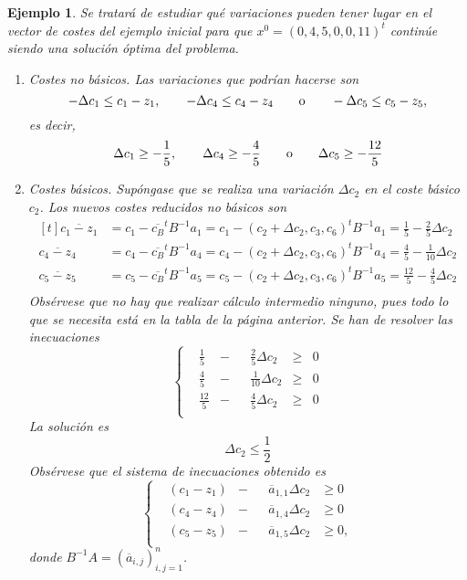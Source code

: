 \documentclass[11pt]{report}
\theoremstyle{mytheorem}
\theoremstyle{mydefinition}
\theoremstyle{myexample}
\newtheorem*{example}{Ejemplo}
\begin{document}
\begin{example}
Se tratará de estudiar qué variaciones pueden tener lugar en el vector de costes del ejemplo inicial para que $x^0 = (0,4,5,0,0,11)^t$ continúe siendo una solución óptima del problema.
\begin{enumerate}
    \item \textit{Costes no básicos}. Las variaciones que podrían hacerse son
    \[-\Delta c_1 \leq c_1-z_1, \qquad -\Delta c_4 \leq c_4-z_4 \qquad \textup{o} \qquad -\Delta c_5 \leq c_5-z_5,\]
    es decir,
    \[\Delta c_1 \geq -\frac{1}{5}, \qquad \Delta c_4 \geq -\frac{4}{5} \qquad \textup{o} \qquad \Delta c_5 \geq -\frac{12}{5}\]
    \item \textit{Costes básicos}. Supóngase que se realiza una variación $\Delta c_2$ en el coste básico $c_2$. Los nuevos costes reducidos no básicos son
    \[\begin{aligned}[t]
        \overline{c_1-z_1} &= c_1-\overline{c_B}^tB^{-1}a_1 = c_1-
            (c_2+\Delta c_2, c_3, c_6)^tB^{-1}a_1 = \frac{1}{5}-\frac{2}{5}\Delta c_2\\[5pt]
        \overline{c_4-z_4} &= c_4-\overline{c_B}^tB^{-1}a_4 = c_4-
            (c_2+\Delta c_2, c_3, c_6)^tB^{-1}a_4 = \frac{4}{5}-\frac{1}{10} \Delta c_2\\[5pt]
        \overline{c_5-z_5} &= c_5-\overline{c_B}^tB^{-1}a_5 = c_5-
            (c_2+\Delta c_2, c_3, c_6)^tB^{-1}a_5 = \frac{12}{5}-\frac{4}{5} \Delta c_2\\
    \end{aligned}\]
Obsérvese que no hay que realizar cálculo intermedio ninguno, pues todo lo que se necesita está en la tabla de la página anterior. Se han de resolver las inecuaciones
\[\left\{\begin{alignedat}{10}
& \frac{1}{5}  & {}-{} & &\frac{2}{5}\Delta c_2  & {}\geq{} & 0 \\[5pt]
& \frac{4}{5}  & {}-{} & &\frac{1}{10}\Delta c_2  & {}\geq{} & 0 \\[5pt]
& \frac{12}{5} & {}-{} & &\frac{4}{5}\Delta c_2 & {}\geq{} & 0 \\
\end{alignedat}\right.\]
La solución es
\[\Delta c_2 \leq \frac{1}{2}\]
Obsérvese que el sistema de inecuaciones obtenido es
\[\left\{\begin{alignedat}{10}
& (c_1-z_1) & {}-{} & &\overline{a}_{1,1}\Delta c_2  & {}\geq{} 0 \\[5pt]
& (c_4-z_4) & {}-{} & &\overline{a}_{1,4}\Delta c_2  & {}\geq{} 0 \\[5pt]
& (c_5-z_5) & {}-{} & &\overline{a}_{1,5}\Delta c_2  & {}\geq{} 0, \\
\end{alignedat}\right.\]
donde $B^{-1}A = (\overline{a}_{i,j})_{i,j=1}^n$.


\end{enumerate}
\end{example}
\end{document}
